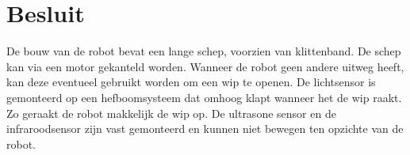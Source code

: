 \documentclass[eind]{penoverslag}
\begin{document}
%
%
%

\section{Besluit}
\label{sec:Besluit}
De bouw van de robot bevat een lange schep, voorzien van klittenband. De schep kan via een motor gekanteld worden. Wanneer de robot geen andere uitweg heeft, kan deze eventueel gebruikt worden om een wip te openen. De lichtsensor is gemonteerd op een hefboomsysteem dat omhoog klapt wanneer het de wip raakt. Zo geraakt de robot makkelijk de wip op. De ultrasone sensor en de infraroodsensor zijn vast gemonteerd en kunnen niet bewegen ten opzichte van de robot.\\
\end{document}
